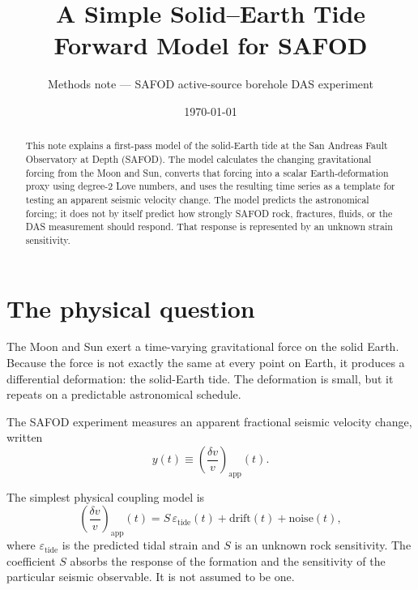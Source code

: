\documentclass[11pt]{article}
\title{\textbf{A Simple Solid--Earth Tide Forward Model for SAFOD}}
\author{Methods note --- SAFOD active-source borehole DAS experiment}
\date{\today}
\newcommand{\eps}{\varepsilon}
\begin{document}
\maketitle

\begin{abstract}
This note explains a first-pass model of the solid-Earth tide at the San
Andreas Fault Observatory at Depth (SAFOD).  The model calculates the changing
gravitational forcing from the Moon and Sun, converts that forcing into a
scalar Earth-deformation proxy using degree-2 Love numbers, and uses the
resulting time series as a template for testing an apparent seismic velocity
change.  The model predicts the astronomical forcing; it does not by itself
predict how strongly SAFOD rock, fractures, fluids, or the DAS measurement
should respond.  That response is represented by an unknown strain sensitivity.
\end{abstract}

\tableofcontents

\section{The physical question}

The Moon and Sun exert a time-varying gravitational force on the solid Earth.
Because the force is not exactly the same at every point on Earth, it produces
a differential deformation: the solid-Earth tide.  The deformation is small,
but it repeats on a predictable astronomical schedule.

The SAFOD experiment measures an apparent fractional seismic velocity change,
written
\begin{equation}
  y(t) \equiv \left(\frac{\delta v}{v}\right)_{\!\mathrm{app}}(t).
\end{equation}

The simplest physical coupling model is
\begin{equation}
  \left(\frac{\delta v}{v}\right)_{\!\mathrm{app}}(t)
  = S\,\eps_{\mathrm{tide}}(t) + \text{drift}(t) + \text{noise}(t),
  \label{eq:coupling}
\end{equation}
where $\eps_{\mathrm{tide}}$ is the predicted tidal strain and $S$ is an
unknown rock sensitivity.  The coefficient $S$ absorbs the response of the
formation and the sensitivity of the particular seismic observable.  It is
not assumed to be one.
\end{document}
